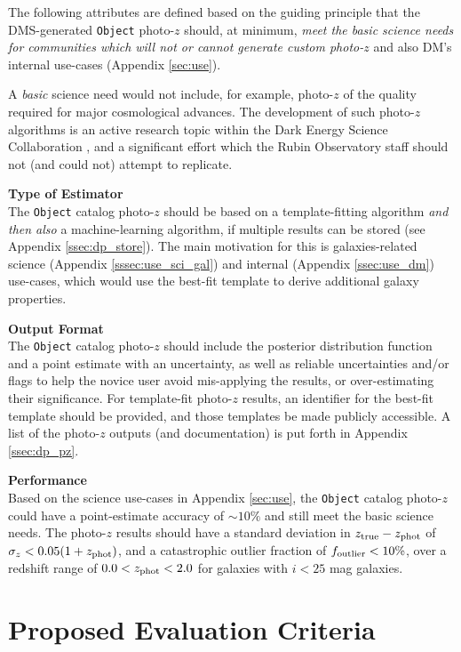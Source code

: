 \documentclass[DM,lsstdraft,toc]{lsstdoc}
\begin{document}
The following attributes are defined based on the guiding principle that the DMS-generated {\tt Object} photo-$z$ should, at minimum, {\it meet the basic science needs for communities which will not or cannot generate custom photo-$z$} and also DM's internal use-cases (Appendix \ref{sec:use}).

A {\it basic} science need would not include, for example, photo-$z$ of the quality required for major cosmological advances.
The development of such photo-$z$ algorithms is an active research topic within the Dark Energy Science Collaboration \citep{2018arXiv180901669T}, and a significant effort which the Rubin Observatory staff should not (and could not) attempt to replicate. 

{\bf Type of Estimator}\\
The {\tt Object} catalog photo-$z$ should be based on a template-fitting algorithm {\it and then also} a machine-learning algorithm, if multiple results can be stored (see Appendix \ref{ssec:dp_store}).
The main motivation for this is galaxies-related science (Appendix \ref{sssec:use_sci_gal}) and internal (Appendix \ref{ssec:use_dm}) use-cases, which would use the best-fit template to derive additional galaxy properties.

{\bf Output Format}\\
The {\tt Object} catalog photo-$z$ should include the posterior distribution function and a point estimate with an uncertainty, as well as reliable uncertainties and/or flags to help the novice user avoid mis-applying the results, or over-estimating their significance.
For template-fit photo-$z$ results, an identifier for the best-fit template should be provided, and those templates be made publicly accessible.
A list of the photo-$z$ outputs (and documentation) is put forth in Appendix \ref{ssec:dp_pz}.

{\bf Performance}\\
Based on the science use-cases in Appendix \ref{sec:use}, the {\tt Object} catalog photo-$z$ could have a point-estimate accuracy of $\sim10\%$ and still meet the basic science needs.
The photo-$z$ results should have a standard deviation in $z_{\rm true}-z_{\rm phot}$ of $\sigma_z < 0.05(1+z_{\rm phot})$, and a catastrophic outlier fraction of $f_{\rm outlier} < 10\%$, over a redshift range of $0.0 < z_{\rm phot} < 2.0$ for galaxies with $i<25$ mag galaxies.


\clearpage
\section{Proposed Evaluation Criteria} \label{sec:eval}
\end{document}
